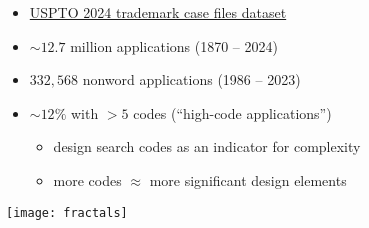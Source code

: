 \documentclass[aspectratio=1610]{beamer}
\begin{document}
\begin{frame}

\begin{itemize}

\item \href{https://www.uspto.gov/ip-policy/economic-research/research-datasets/trademark-case-files-dataset}{USPTO 2024 trademark case files dataset}
\item $\sim 12.7$ million applications (1870 – 2024)
\item $332,568$ nonword applications (1986 – 2023)
\item $\sim 12\%$ with $> 5$ codes (``high-code applications'')
\begin{itemize}
\item design search codes as an indicator for complexity
\item more codes $\approx$ more significant design elements
\end{itemize}

\end{itemize}

\centering

\texttt{[image: fractals]}

\end{frame}

\begin{frame}

\centering



\end{frame}

\begin{frame}

\centering



\end{frame}

\begin{frame}

\centering



\end{frame}

\begin{frame}

\centering



\end{frame}
\end{document}
